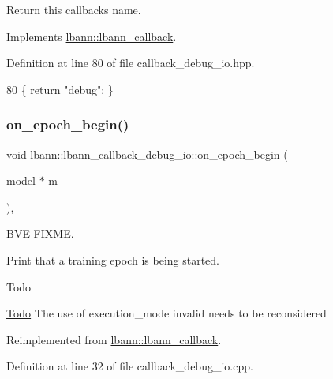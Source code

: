 Return this callback\textquotesingle{}s name. 

Implements \hyperlink{classlbann_1_1lbann__callback_a7522c7a14f1d6a1ea762cc2d7248eb3a}{lbann\+::lbann\+\_\+callback}.



Definition at line 80 of file callback\+\_\+debug\+\_\+io.\+hpp.


\begin{DoxyCode}
80 \{ \textcolor{keywordflow}{return} \textcolor{stringliteral}{"debug"}; \}
\end{DoxyCode}
\mbox{\label{classlbann_1_1lbann__callback__debug__io_aa3d2a6fb4d7375c05ece0058224ea792}} 
\subsubsection{\texorpdfstring{on\+\_\+epoch\+\_\+begin()}{on\_epoch\_begin()}}
{\footnotesize\ttfamily void lbann\+::lbann\+\_\+callback\+\_\+debug\+\_\+io\+::on\+\_\+epoch\+\_\+begin (\begin{DoxyParamCaption}\item[{\hyperlink{classlbann_1_1model}{model} $\ast$}]{m }\end{DoxyParamCaption})\hspace{0.3cm}{\ttfamily [override]}, {\ttfamily [virtual]}}



B\+VE F\+I\+X\+ME. 

Print that a training epoch is being started.

\begin{DoxyRefDesc}{Todo}
\item[\hyperlink{todo__todo000001}{Todo}]The use of execution\+\_\+mode invalid needs to be reconsidered \end{DoxyRefDesc}


Reimplemented from \hyperlink{classlbann_1_1lbann__callback_a4ed9498763412a55953fff71ee3a9456}{lbann\+::lbann\+\_\+callback}.



Definition at line 32 of file callback\+\_\+debug\+\_\+io.\+cpp.


